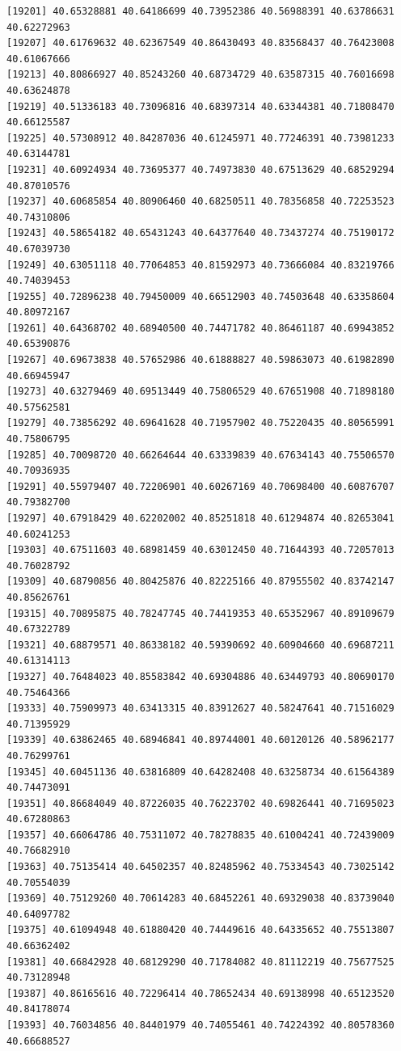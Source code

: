 \documentclass[
  letterpaper,
  DIV=11,
  numbers=noendperiod]{scrartcl}
\begin{document}
\begin{verbatim}
[19201] 40.65328881 40.64186699 40.73952386 40.56988391 40.63786631 40.62272963
[19207] 40.61769632 40.62367549 40.86430493 40.83568437 40.76423008 40.61067666
[19213] 40.80866927 40.85243260 40.68734729 40.63587315 40.76016698 40.63624878
[19219] 40.51336183 40.73096816 40.68397314 40.63344381 40.71808470 40.66125587
[19225] 40.57308912 40.84287036 40.61245971 40.77246391 40.73981233 40.63144781
[19231] 40.60924934 40.73695377 40.74973830 40.67513629 40.68529294 40.87010576
[19237] 40.60685854 40.80906460 40.68250511 40.78356858 40.72253523 40.74310806
[19243] 40.58654182 40.65431243 40.64377640 40.73437274 40.75190172 40.67039730
[19249] 40.63051118 40.77064853 40.81592973 40.73666084 40.83219766 40.74039453
[19255] 40.72896238 40.79450009 40.66512903 40.74503648 40.63358604 40.80972167
[19261] 40.64368702 40.68940500 40.74471782 40.86461187 40.69943852 40.65390876
[19267] 40.69673838 40.57652986 40.61888827 40.59863073 40.61982890 40.66945947
[19273] 40.63279469 40.69513449 40.75806529 40.67651908 40.71898180 40.57562581
[19279] 40.73856292 40.69641628 40.71957902 40.75220435 40.80565991 40.75806795
[19285] 40.70098720 40.66264644 40.63339839 40.67634143 40.75506570 40.70936935
[19291] 40.55979407 40.72206901 40.60267169 40.70698400 40.60876707 40.79382700
[19297] 40.67918429 40.62202002 40.85251818 40.61294874 40.82653041 40.60241253
[19303] 40.67511603 40.68981459 40.63012450 40.71644393 40.72057013 40.76028792
[19309] 40.68790856 40.80425876 40.82225166 40.87955502 40.83742147 40.85626761
[19315] 40.70895875 40.78247745 40.74419353 40.65352967 40.89109679 40.67322789
[19321] 40.68879571 40.86338182 40.59390692 40.60904660 40.69687211 40.61314113
[19327] 40.76484023 40.85583842 40.69304886 40.63449793 40.80690170 40.75464366
[19333] 40.75909973 40.63413315 40.83912627 40.58247641 40.71516029 40.71395929
[19339] 40.63862465 40.68946841 40.89744001 40.60120126 40.58962177 40.76299761
[19345] 40.60451136 40.63816809 40.64282408 40.63258734 40.61564389 40.74473091
[19351] 40.86684049 40.87226035 40.76223702 40.69826441 40.71695023 40.67280863
[19357] 40.66064786 40.75311072 40.78278835 40.61004241 40.72439009 40.76682910
[19363] 40.75135414 40.64502357 40.82485962 40.75334543 40.73025142 40.70554039
[19369] 40.75129260 40.70614283 40.68452261 40.69329038 40.83739040 40.64097782
[19375] 40.61094948 40.61880420 40.74449616 40.64335652 40.75513807 40.66362402
[19381] 40.66842928 40.68129290 40.71784082 40.81112219 40.75677525 40.73128948
[19387] 40.86165616 40.72296414 40.78652434 40.69138998 40.65123520 40.84178074
[19393] 40.76034856 40.84401979 40.74055461 40.74224392 40.80578360 40.66688527

\end{verbatim}
\end{document}
